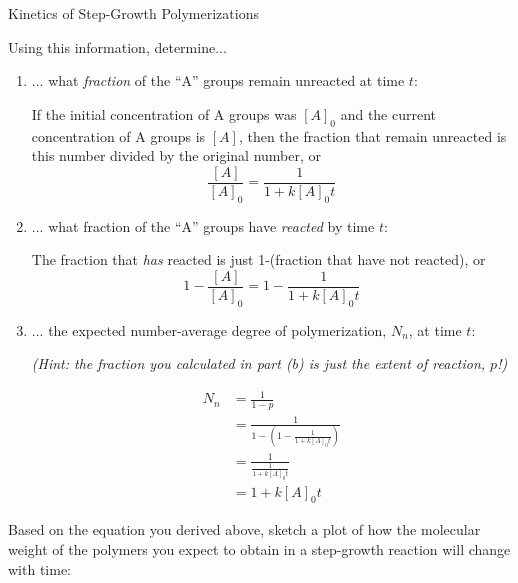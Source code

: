 \begin{activity}{Kinetics of Step-Growth Polymerizations}
\begin{ctqs}

	\question Using this information, determine...
	
		\begin{enumerate}
			\item ... what \emph{fraction} of the ``A'' groups remain unreacted at time $t$:
			
				\begin{solution}[1in]
					If the initial concentration of A groups was $[A]_0$ and the current concentration of A groups is $[A]$, then the fraction that remain unreacted is this number divided by the original number, or
					\begin{equation*}
						\frac{[A]}{[A]_0} = \frac{1}{1 + k[A]_0 t}
					\end{equation*}
				\end{solution}
			
			\item ... what fraction of the ``A'' groups have \emph{reacted} by time $t$:
			
				\begin{solution}[1in]
					The fraction that \emph{has} reacted is just 1-(fraction that have not reacted), or
					\begin{equation*}
						1- \frac{[A]}{[A]_0} = 1-\frac{1}{1 + k[A]_0 t}
					\end{equation*}
				\end{solution}
		
			\item ... the expected number-average degree of polymerization, $N_n$, at time $t$: \label{\labelbase:ctq:catNn}
			
				\emph{(Hint: the fraction you calculated in part (b) is just the extent of reaction, $p$!)}
			
				\begin{solution}[1.75in]
					\begin{align*}
						N_n &= \frac{1}{1-p}\\
							&= \frac{1}{1-\left(1- \frac{1}{1 + k[A]_0 t}\right)}\\
							&= \frac{1}{\frac{1}{1 + k[A]_0 t}}\\
							&= 1 + k[A]_0 t
					\end{align*}
				\end{solution}
			
		\end{enumerate}
	
	\question Based on the equation you derived above, sketch a plot of how the molecular weight of the polymers you expect to obtain in a step-growth reaction will change with time:
	

\end{ctqs}
\end{activity}
